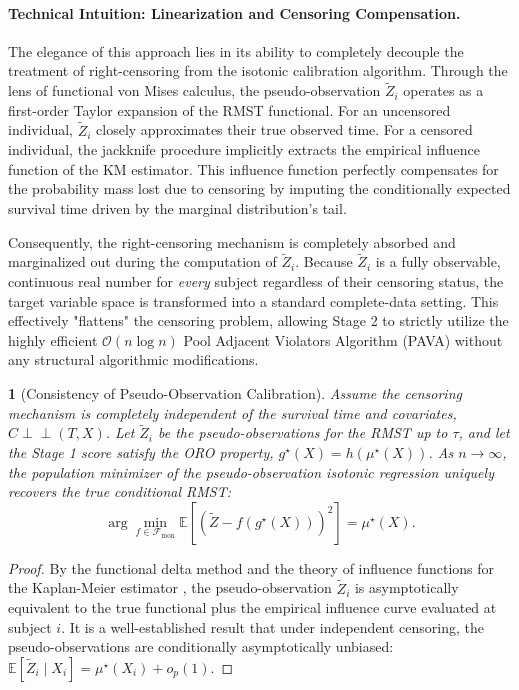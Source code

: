 \documentclass[11pt]{article}
\theoremstyle{plain}
\theoremstyle{plain}
\theoremstyle{plain}
\theoremstyle{plain}
\newtheorem{theorem}{\protect\theoremname}
\theoremstyle{plain}
\theoremstyle{plain}
\theoremstyle{plain}
\providecommand{\theoremname}{Theorem}
\begin{document}
{\paragraph{Technical Intuition: Linearization and Censoring Compensation.}
The elegance of this approach lies in its ability to completely decouple the treatment of right-censoring from the isotonic calibration algorithm. Through the lens of functional von Mises calculus, the pseudo-observation $\tilde{Z}_i$ operates as a first-order Taylor expansion of the RMST functional. For an uncensored individual, $\tilde{Z}_i$ closely approximates their true observed time. For a censored individual, the jackknife procedure implicitly extracts the empirical influence function of the KM estimator. This influence function perfectly compensates for the probability mass lost due to censoring by imputing the conditionally expected survival time driven by the marginal distribution's tail. 

Consequently, the right-censoring mechanism is completely absorbed and marginalized out during the computation of $\tilde{Z}_i$. Because $\tilde{Z}_i$ is a fully observable, continuous real number for \emph{every} subject regardless of their censoring status, the target variable space is transformed into a standard complete-data setting. This effectively "flattens" the censoring problem, allowing Stage 2 to strictly utilize the highly efficient $\mathcal{O}(n \log n)$ Pool Adjacent Violators Algorithm (PAVA) without any structural algorithmic modifications.

\begin{theorem}[Consistency of Pseudo-Observation Calibration]
\label{thm:pseudo_iso}
Assume the censoring mechanism is completely independent of the survival time and covariates, $C \perp\!\!\!\perp (T, X)$. Let $\tilde{Z}_i$ be the pseudo-observations for the RMST up to $\tau$, and let the Stage 1 score satisfy the ORO property, $g^\star(X) = h(\mu^\star(X))$. As $n \to \infty$, the population minimizer of the pseudo-observation isotonic regression uniquely recovers the true conditional RMST:
\[
    \arg\min_{f \in \mathcal{F}_{\text{mon}}} \mathbb{E}\left[ \left( \tilde{Z} - f(g^\star(X)) \right)^2 \right] = \mu^\star(X).
\]
\end{theorem}

\begin{proof}
By the functional delta method and the theory of influence functions for the Kaplan-Meier estimator \citep{graw2009pseudo}, the pseudo-observation $\tilde{Z}_i$ is asymptotically equivalent to the true functional plus the empirical influence curve evaluated at subject $i$. It is a well-established result that under independent censoring, the pseudo-observations are conditionally asymptotically unbiased: $\mathbb{E}[\tilde{Z}_i \mid X_i] = \mu^\star(X_i) + o_p(1)$. 


\end{proof}}
\end{document}
